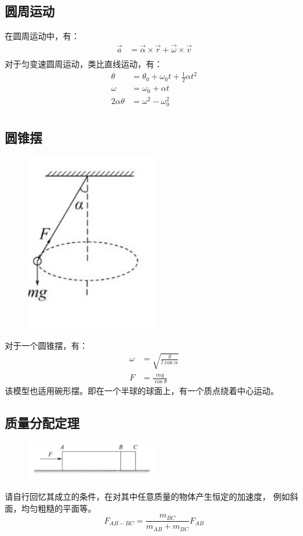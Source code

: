 \documentclass{ctexart}
\begin{document}
\subsection{圆周运动}
在圆周运动中，有：
\begin{align*}
    \vec{a} &= \vec{\alpha} \times \vec{r} + \vec{\omega} \times \vec{v} \\
\end{align*}
对于匀变速圆周运动，类比直线运动，有：
\begin{align*}
    \theta &= \theta_0 + \omega_0 t + \frac{1}{2} \alpha t^2 \\
    \omega &= \omega_0 + \alpha t \\
    2 \alpha \theta &= \omega^2 - \omega_0^2 \\
\end{align*}
\subsection{圆锥摆}
\begin{figure}[H]
    \centering
    \includegraphics[width=0.5\textwidth]{img/yuan.jpg}
\end{figure}
对于一个圆锥摆，有：
\begin{align*}
    \omega &= \sqrt{\frac{g}{l \cos \alpha}} \\
    F &= \frac{mg}{\cos \theta}
\end{align*}
该模型也适用碗形摆。即在一个半球的球面上，有一个质点绕着中心运动。
\subsection{质量分配定理}
\begin{figure}[H]
    \centering
    \includegraphics[width=0.5\textwidth]{img/zhi.jpg}
\end{figure}
请自行回忆其成立的条件，在对其中任意质量的物体产生恒定的加速度，
例如斜面，均匀粗糙的平面等。
$$
    F_{AB-BC} = \frac{m_{BC}}{m_{AB} + m_{BC}} F_{AB}
$$
\end{document}
